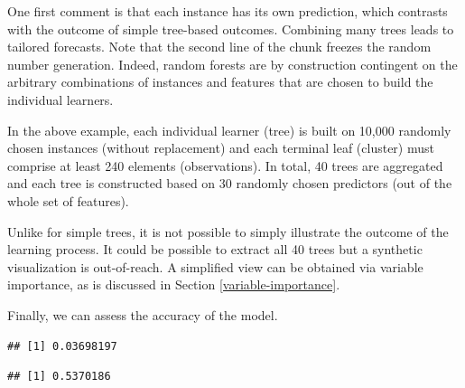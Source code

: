 \documentclass[]{krantz}
\makeatletter
\newenvironment{Shaded}{\begin{snugshade}}{\end{snugshade}}
\newcommand{\CommentTok}[1]{\textcolor[rgb]{0.37,0.37,0.37}{\textit{#1}}}
\newcommand{\DecValTok}[1]{\textcolor[rgb]{0.06,0.06,0.06}{#1}}
\newcommand{\KeywordTok}[1]{\textcolor[rgb]{0.27,0.27,0.27}{\textbf{#1}}}
\newcommand{\NormalTok}[1]{#1}
\newcommand{\OperatorTok}[1]{\textcolor[rgb]{0.43,0.43,0.43}{\textbf{#1}}}
\newcommand{\StringTok}[1]{\textcolor[rgb]{0.5,0.5,0.5}{#1}}
\newenvironment{kframe}{%
\medskip{}
\setlength{\fboxsep}{.8em}
 \def\at@end@of@kframe{}%
 \ifinner\ifhmode%
  \def\at@end@of@kframe{\end{minipage}}%
  \begin{minipage}{\columnwidth}%
 \fi\fi%
 \def\FrameCommand##1{\hskip\@totalleftmargin \hskip-\fboxsep
 \colorbox{shadecolor}{##1}\hskip-\fboxsep
     \hskip-\linewidth \hskip-\@totalleftmargin \hskip\columnwidth}%
 \MakeFramed {\advance\hsize-\width
   \@totalleftmargin\z@ \linewidth\hsize
   \@setminipage}}%
 {\par\unskip\endMakeFramed%
 \at@end@of@kframe}
\renewenvironment{Shaded}{\begin{kframe}}{\end{kframe}}
\theoremstyle{definition}
\theoremstyle{definition}
\theoremstyle{definition}
\theoremstyle{remark}
\makeatother
\begin{document}
\normalsize

One first comment is that each instance has its own prediction, which
contrasts with the outcome of simple tree-based outcomes. Combining many
trees leads to tailored forecasts. Note that the second line of the
chunk freezes the random number generation. Indeed, random forests are
by construction contingent on the arbitrary combinations of instances
and features that are chosen to build the individual learners.

In the above example, each individual learner (tree) is built on 10,000
randomly chosen instances (without replacement) and each terminal leaf
(cluster) must comprise at least 240 elements (observations). In total,
40 trees are aggregated and each tree is constructed based on 30
randomly chosen predictors (out of the whole set of features).

Unlike for simple trees, it is not possible to simply illustrate the
outcome of the learning process. It could be possible to extract all 40
trees but a synthetic visualization is out-of-reach. A simplified view
can be obtained via variable importance, as is discussed in Section
\ref{variable-importance}.

Finally, we can assess the accuracy of the model.

\footnotesize

\begin{Shaded}
\end{Shaded}

\begin{verbatim}
## [1] 0.03698197
\end{verbatim}

\begin{Shaded}
\end{Shaded}

\begin{verbatim}
## [1] 0.5370186
\end{verbatim}
\end{document}
